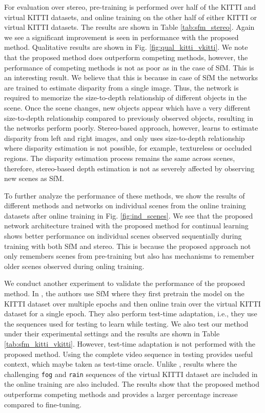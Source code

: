 \documentclass[lettersize,journal]{IEEEtran}
\begin{document}
 For evaluation over stereo, pre-training is performed over half of the KITTI and virtual KITTI datasets, and online training on the other half of either KITTI or virtual KITTI datasets. The results are shown in Table \ref{tab:sfm_stereo}. Again we see a significant improvement is seen in performance with the proposed method. Qualitative results are shown in Fig. \ref{fig:qual_kitti_vkitti}. We note that the proposed method does outperform competing methods, however, the performance of competing methods is not as poor as in the case of SfM. This is an interesting result. We believe that this is because in case of SfM the networks are trained to estimate disparity from a single image. Thus, the network is required to memorize the size-to-depth relationship of different objects in the scene. Once the scene changes, new objects appear which have a very different size-to-depth relationship compared to previously observed objects, resulting in the networks perform poorly. Stereo-based approach, however, learns to estimate disparity from left and right images, and only uses size-to-depth relationship where disparity estimation is not possible, for example, textureless or occluded regions. The disparity estimation process remains the same across scenes, therefore, stereo-based depth estimation is not as severely affected by observing new scenes as SfM.
 
 To further analyze the performance of these methods, we show the results of different methods and networks on individual scenes from the online training datasets after online training in Fig. \ref{fig:ind_scenes}. We see that the proposed network architecture trained with the proposed method for continual learning shows better performance on individual scenes observed sequentially during training with both SfM and stereo. This is because the proposed approach not only remembers scenes from pre-training but also has mechanisms to remember older scenes observed during onling training.
 
 We conduct another experiment to validate the performance of the proposed method. In \cite{zhang2020online}, the authors use SfM where they first pretrain the model on the KITTI dataset over multiple epochs and then online train over the virtual KITTI dataset for a single epoch. They also perform test-time adaptation, i.e., they use the sequences used for testing to learn while testing. We also test our method under their experimental settings and the results are shown in Table \ref{tab:sfm_kitti_vkitti}. However, test-time adaptation is not performed with the proposed method. Using the complete video sequence in testing provides useful context, which maybe taken as test-time oracle. Unlike \cite{zhang2020online}, results where the challenging \texttt{fog} and \texttt{rain} sequences of the virtual KITTI dataset are included in the online training are also included. The results show that the proposed method outperforms competing methods and provides a larger percentage increase compared to fine-tuning.
 
\end{document}
